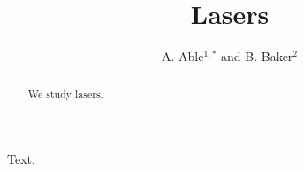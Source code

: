 \documentclass[12pt]{article}
\begin{document}
\title{Lasers}
\author{A. Able$^{1,*}$ and B. Baker$^2$}
\address{$^1$Univ A, City A\\
$^2$Univ B, City B\\
$^*$Corresponding author: able@x.edu}
\begin{abstract}
We study lasers.
\end{abstract}
Text.
\end{document}
